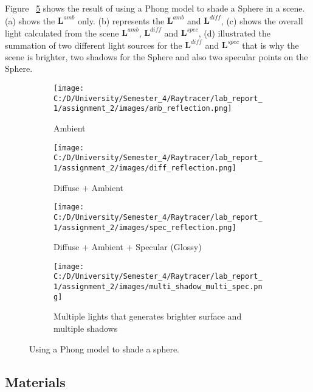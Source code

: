 \documentclass{article}
\begin{document}
	Figure ~\ref{fig:7} shows the result of using a Phong model to shade a Sphere in a scene. (a) shows the $\pmb{L}^{amb}$ only. (b) represents the $\pmb{L}^{amb}$ and $\pmb{L}^{diff}$, (c) shows the overall light calculated from the scene $\pmb{L}^{amb}$, $\pmb{L}^{diff}$ and $\pmb{L}^{spec}$, (d) illustrated the summation of two different light sources for the $\pmb{L}^{diff}$ and $\pmb{L}^{spec}$ that is why the scene is brighter, two shadows for the Sphere and also two specular points on the Sphere.
	\begin{figure}[H]
		\begin{center}
			\begin{subfigure}{.3\textwidth}
				\centering
				\texttt{[image: C:/D/University/Semester\_4/Raytracer/lab\_report\_1/assignment\_2/images/amb\_reflection.png]}  
				\caption{Ambient}
				\label{fig:sub-first}
			\end{subfigure}
			\begin{subfigure}{.3\textwidth}
				\centering
				\texttt{[image: C:/D/University/Semester\_4/Raytracer/lab\_report\_1/assignment\_2/images/diff\_reflection.png]}  
				\caption{Diffuse + Ambient}
				\label{fig:sub-second}
			\end{subfigure}
			\begin{subfigure}{.3\textwidth}
				\centering
				\texttt{[image: C:/D/University/Semester\_4/Raytracer/lab\_report\_1/assignment\_2/images/spec\_reflection.png]}  
				\caption{Diffuse + Ambient + Specular (Glossy)}
				\label{fig:sub-third}
			\end{subfigure}
			
			\begin{subfigure}{.3\textwidth}
				\centering
				\texttt{[image: C:/D/University/Semester\_4/Raytracer/lab\_report\_1/assignment\_2/images/multi\_shadow\_multi\_spec.png]}  
				\caption{Multiple lights that generates brighter surface and multiple shadows}
				\label{fig:sub-third}
			\end{subfigure}
			\caption{Using a Phong model to shade a sphere.}
			\label{fig:7}
		\end{center}
	\end{figure}
	
	
	\subsection{Materials}
	
\end{document}

